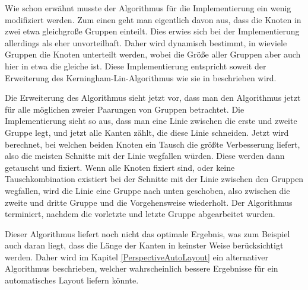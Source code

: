Wie schon erwähnt musste der Algorithmus für die Implementierung ein wenig
modifiziert werden. Zum einen  geht man eigentlich davon aus, dass die Knoten
in zwei etwa gleichgroße Gruppen einteilt. Dies erwies sich bei der
Implementierung allerdings als eher unvorteilhaft. Daher wird dynamisch
bestimmt, in wieviele Gruppen die Knoten unterteilt werden, wobei die Größe
aller Gruppen aber auch hier in etwa die gleiche ist. Diese
Implementierung entspricht soweit der Erweiterung des
Kerningham-Lin-Algorithmus wie sie in \cite{Layout} beschrieben
wird.\vspace{10pt}

Die Erweiterung des Algorithmus sieht jetzt vor, dass man den Algorithmus jetzt
für alle möglichen zweier Paarungen von Gruppen betrachtet. Die Implementierung
sieht so aus, dass man eine Linie zwischen die erste und zweite Gruppe legt, und
jetzt alle Kanten zählt, die diese Linie schneiden. Jetzt wird berechnet, bei
welchen beiden Knoten ein Tausch die größte Verbesserung liefert, also die
meisten Schnitte mit der Linie wegfallen würden. Diese werden dann getauscht und
fixiert. Wenn alle Knoten fixiert sind, oder keine Tauschkombination existiert
bei der Schnitte mit der Linie zwischen den Gruppen wegfallen, wird die Linie
eine Gruppe nach unten geschoben, also zwischen die zweite und dritte Gruppe und
die Vorgehensweise wiederholt. Der Algorithmus terminiert, nachdem die vorletzte
und letzte Gruppe abgearbeitet wurden.\vspace{10pt}

Dieser Algorithmus liefert noch nicht das optimale Ergebnis, was zum Beispiel
auch daran liegt, dass die Länge der Kanten in keinster Weise berücksichtigt
werden. Daher wird im Kapitel \ref{PerspectiveAutoLayout} ein alternativer
Algorithmus beschrieben, welcher wahrscheinlich bessere Ergebnisse für ein
automatisches Layout liefern könnte.\vspace{10pt}
